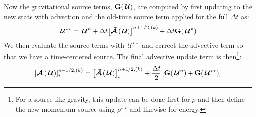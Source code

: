 \documentclass[linenumbers]{aastex631}
\newcommand{\Ub}{\mathbf{U}}
\newcommand{\gb}{\mathbf{g}}
\newcommand{\Uc}{{\,\bm{\mathcal{U}}}}
\newcommand{\ex}{{\bf e}_x}
\newcommand{\Gb}{{\bf G}}
\newcommand{\Adv}[1]{{\left [\boldsymbol{\mathcal{A}} \left(#1\right)\right]}}
\newcommand{\Advt}[1]{{\left [\boldsymbol{\mathcal{\tilde{A}}} \left(#1\right)\right]}}
\begin{document}
\begin{itemize}
\begin{itemize}
\begin{itemize}
    Now the gravitational source terms, $\Gb(\Uc)$, are computed by first updating to the
    new state with advection and the old-time source term applied for the full $\Delta t$ as:
    \begin{equation}
      \Uc^{\star\star} = \Uc^n + \Delta t \Advt{\Uc}^{n+1/2,(k)} + \Delta t \Gb(\Uc^n)\label{eq:grav_pred}
    \end{equation}
    We then evaluate the source terms with $\Uc^{\star\star}$ and
    correct the advective term so that we have a time-centered
    source.
    The final advective update term is then\footnote{For a source like gravity, this update can be done first for $\rho$ and then define the new momentum source using $\rho^{\star\star}$ and likewise for energy.}:
    \begin{equation}
      \Adv{\Uc}^{n+1/2,(k)}_{i} = \Advt{\Uc}^{n+1/2,(k)}_{i} +
      \frac{\Delta t}{2} \left [\Gb(\Uc^n) + \Gb(\Uc^{\star\star}) \right ]\label{eq:grav_corr}
    \end{equation}



\end{itemize}
\end{itemize}
\end{itemize}
\end{document}
